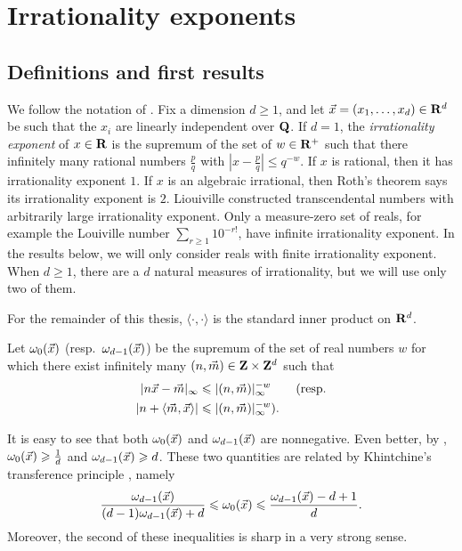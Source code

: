 
\chapter{Irrationality exponents}\label{chapter:irrationality-exponent}





\section{Definitions and first results}

We follow the notation of \cite{laurent-2009}. Fix a dimension 
$d\geqslant 1$, and let $\vec{x}=(x_1,\dots,x_d)\in \mathbf{R}^d$ be such that the $x_i$ 
are linearly independent over $\mathbf{Q}$. If $d = 1$, the \emph{irrationality 
exponent} of $x\in \mathbf{R}$ is the supremum of the set of $w\in \mathbf{R}^+$ such that 
there infinitely many rational numbers $\frac p q$ with 
$\left| x - \frac p q\right| \leqslant q^{-w}$. If $x$ is rational, then it has 
irrationality exponent $1$. If $x$ is an algebraic irrational, then Roth's 
theorem says its irrationality exponent is $2$. Liouiville constructed 
transcendental numbers with arbitrarily large irrationality exponent. Only 
a measure-zero set of reals, for example the Louiville number 
$\sum_{r\geqslant 1} 10^{-r!}$, have infinite irrationality exponent. In the 
results below, we will only consider reals with finite irrationality exponent. 
When $d\geqslant 1$, there are a $d$ natural measures of irrationality, but we 
will use only two of them. 

For the remainder of this thesis, $\langle \cdot,\cdot\rangle$ is the standard 
inner product on $\mathbf{R}^d$. 

\begin{definition}\label{def:approx-exp}
Let $\omega_0(\vec{x})$ (resp.~$\omega_{d-1}(\vec{x})$) be the supremum of the set of 
real numbers $w$ for which there exist infinitely many 
$(n,\vec{m})\in \mathbf{Z}\times\mathbf{Z}^d$ such that 
\begin{align*}
	|n \vec{x} - \vec{m}|_\infty 
		&\leqslant |(n,\vec{m})|_\infty^{-w}  \qquad\text{(resp.} \\
	|n +\langle \vec{m},\vec{x}\rangle| 
		&\leqslant |(n,\vec{m})|_\infty^{-w} \text{).}
\end{align*}
\end{definition}

It is easy to see that both $\omega_0(\vec{x})$ and $\omega_{d-1}(\vec{x})$ are 
nonnegative. Even better, by \cite[Th.~2 Cor]{laurent-2009}, 
$\omega_0(\vec{x}) \geqslant \frac 1 d$ and $\omega_{d-1}(\vec{x}) \geqslant d$. 
These two quantities are related by Khintchine's transference 
principle \cite[Th.~2]{laurent-2009}, namely 
\[
	\frac{\omega_{d-1}(\vec{x})}{(d-1) \omega_{d-1}(\vec{x})+d} \leqslant \omega_0(\vec{x}) \leqslant \frac{\omega_{d-1}(\vec{x})-d+1}{d} .
\]
Moreover, the second of these inequalities is sharp in a very strong sense. 

